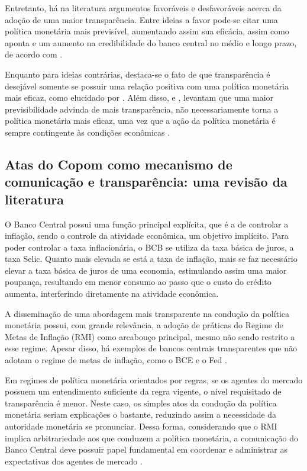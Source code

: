 Entretanto, há na literatura argumentos favoráveis e desfavoráveis acerca da adoção de uma maior transparência. Entre ideias a favor pode-se citar uma política monetária mais previsível, aumentando assim sua eficácia, assim como aponta  e um aumento na credibilidade do banco central no médio e longo prazo, de acordo com .

Enquanto para ideias contrárias, destaca-se o fato de que transparência é desejável somente se possuir uma relação positiva com uma política monetária mais eficaz, como elucidado por . Além disso,  e , levantam que uma maior previsibilidade advinda de mais transparência, não necessariamente torna a política monetária mais eficaz, uma vez que a ação da política monetária é sempre contingente às condições econômicas \cite{adonias_evaristo2009comunicaccao}. 

\subsection{Atas do Copom como mecanismo de comunicação e transparência: uma revisão da literatura}

O Banco Central possui uma função principal explícita, que é a de controlar a inflação, sendo o controle da atividade econômica, um objetivo implícito. Para poder controlar a taxa inflacionária, o BCB se utiliza da taxa básica de juros, a taxa Selic. Quanto mais elevada se está a taxa de inflação, mais se faz necessário elevar a taxa básica de juros de uma economia, estimulando assim uma maior poupança, resultando em menor consumo ao passo que o custo do crédito aumenta, interferindo diretamente na atividade econômica.

A disseminação de uma abordagem mais transparente na condução da política monetária possui, com grande relevância, a adoção de práticas do Regime de Metas de Inflação (RMI) como arcabouço principal, mesmo não sendo restrito a esse regime. Apesar disso, há exemplos de bancos centrais transparentes que não adotam o regime de metas de inflação, como o BCE e o Fed \cite{issing2005}. 

Em regimes de política monetária orientados por regras, se os agentes do mercado possuem um entendimento suficiente da regra vigente, o nível requisitado de transparência é menor. Neste caso, os simples atos da condução da política monetária seriam explicações o bastante, reduzindo assim a necessidade da autoridade monetária se pronunciar. Dessa forma, considerando que o RMI implica arbitrariedade aos que conduzem a política monetária, a comunicação do Banco Central deve possuir papel fundamental em coordenar e administrar as expectativas dos agentes de mercado \cite{adonias_evaristo2009comunicaccao}.

